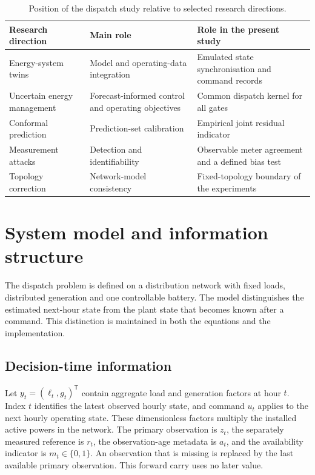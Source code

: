 \documentclass[11pt,a4paper]{article}
\begin{document}
\begin{table}[t]
\centering\small
\caption{Position of the dispatch study relative to selected research directions.}\label{tab:position}
\begin{tabular}{>{\raggedright\arraybackslash}p{.23\linewidth}>{\raggedright\arraybackslash}p{.30\linewidth}>{\raggedright\arraybackslash}p{.37\linewidth}}
\toprule
Research direction & Main role & Role in the present study\\
\midrule
Energy-system twins \cite{ardebili,hueros,zhang} & Model and operating-data integration & Emulated state synchronisation and command records\\
Uncertain energy management \cite{panda,rahman,li} & Forecast-informed control and operating objectives & Common dispatch kernel for all gates\\
Conformal prediction \cite{angelopoulos,oliveira,gibbs} & Prediction-set calibration & Empirical joint residual indicator\\
Measurement attacks \cite{liu,pasqualetti} & Detection and identifiability & Observable meter agreement and a defined bias test\\
Topology correction \cite{dongliu} & Network-model consistency & Fixed-topology boundary of the experiments\\
\bottomrule
\end{tabular}
\end{table}

\section{System model and information structure}\label{sec:model}
The dispatch problem is defined on a distribution network with fixed loads, distributed generation and one controllable battery. The model distinguishes the estimated next-hour state from the plant state that becomes known after a command. This distinction is maintained in both the equations and the implementation.

\subsection{Decision-time information}
Let $y_t=(\ell_t,g_t)^{\mathsf T}$ contain aggregate load and generation factors at hour $t$. Index $t$ identifies the latest observed hourly state, and command $u_t$ applies to the next hourly operating state. These dimensionless factors multiply the installed active powers in the network. The primary observation is $z_t$, the separately measured reference is $r_t$, the observation-age metadata is $a_t$, and the availability indicator is $m_t\in\{0,1\}$. An observation that is missing is replaced by the last available primary observation. This forward carry uses no later value.
\end{document}
